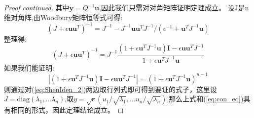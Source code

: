 \documentclass[notheorems,xetex,mathserif,serif]{beamer}
\begin{document}
\begin{frame}
\begin{proof}[Proof continued]
其中$\bm{y}=Q^{-1}\bm{u}$,因此我们只需对对角矩阵证明定理成立。
设J是n维对角阵,由Woodbury矩阵恒等式可得:
\begin{equation}
(J+\epsilon \bm{u}\bm{u}^T)^{-1}=J^{-1}-J^{-1}\bm{u}\bm{u}^TJ^{-1}/(\epsilon^{-1}+\bm{u}^TJ^{-1}\bm{u})
\end{equation}
整理得:
\begin{equation}\label{eq:ShenIden_2}
(J+\epsilon \bm{u}\bm{u}^T)^{-1}=J^{-1}\frac{(1+\epsilon\bm{u}^TJ^{-1}\bm{u})\bm{I}-\epsilon \bm{u}\bm{u}^TJ^{-1}}{1+\epsilon\bm{u}^TJ^{-1}\bm{u}}
\end{equation}
如果我们能证明:
\begin{equation}
|(1+\epsilon\bm{u}^TJ^{-1}\bm{u})\bm{I}-\epsilon \bm{u}\bm{u}^TJ^{-1}|=(1+\epsilon\bm{u}^TJ^{-1}\bm{u})^{n-1}
\end{equation}
则通过对(\ref{eq:ShenIden_2})两边取行列式即可得到要证的式子，这里设$J=\text{diag}(\lambda_1,...\lambda_n)$,取$y=\sqrt{\epsilon}(u_1/\sqrt{\lambda_1},...u_n/\sqrt{\lambda_n})$,那么上式和(\ref{eq:con_eq})具有相同的形式，因此定理结论成立。
\end{proof}
\end{frame}
\end{document}
